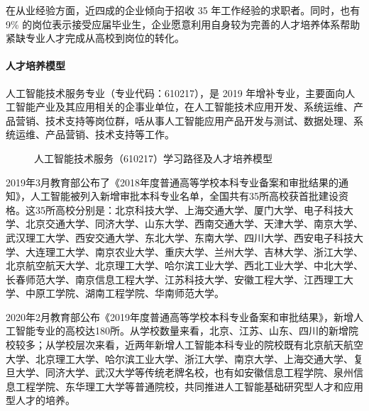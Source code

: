 \documentclass[letterpaper,10pt,english]{sphinxmanual}
\begin{document}
在从业经验方面，近四成的企业倾向于招收 3\sphinxhyphen{}5
年工作经验的求职者。同时，也有 9\%
的岗位表示接受应届毕业生，企业愿意利用自身较为完善的人才培养体系帮助紧缺专业人才完成从高校到岗位的转化。%
\begin{footnote}[750]\sphinxAtStartFootnote
{}
%
\end{footnote}


\paragraph{人才培养模型}
\label{\detokenize{chapter_project/AI_talents:id15}}
人工智能技术服务专业（专业代码：610217），是 2019
年增补专业，主要面向人工智能产业及其应用相关的企事业单位，在人工智能技术应用开发、系统运维、产品营销、技术支持等岗位群，咶从事人工智能应用产品开发与测试、数据处理、系统运维、产品营销、技术支持等工作。

\begin{figure}[H]
\centering
\capstart

\noindent{}
\caption{人工智能技术服务（610217）学习路径及人才培养模型}\label{\detokenize{chapter_project/AI_talents:id23}}\end{figure}

2019年3月教育部公布了《2018年度普通高等学校本科专业备案和审批结果的通知》，人工智能被列入新增审批本科专业名单，全国共有35所高校获首批建设资格。这35所高校分别是：北京科技大学、上海交通大学、厦门大学、电子科技大学、北京交通大学、同济大学、山东大学、西南交通大学、天津大学、南京大学、武汉理工大学、西安交通大学、东北大学、东南大学、四川大学、西安电子科技大学、大连理工大学、南京农业大学、重庆大学、兰州大学、吉林大学、浙江大学、北京航空航天大学、北京理工大学、哈尔滨工业大学、西北工业大学、中北大学、长春师范大学、南京信息工程大学、江苏科技大学、安徽工程大学、江西理工大学、中原工学院、湖南工程学院、华南师范大学。

2020年2月教育部公布《2019年度普通高等学校本科专业备案和审批结果》，新增人工智能专业的高校达180所。从学校数量来看，北京、江苏、山东、四川的新增院校较多；从学校层次来看，近两年新增人工智能本科专业的院校既有北京航天航空大学、北京理工大学、哈尔滨工业大学、浙江大学、南京大学、上海交通大学、复旦大学、同济大学、武汉大学等传统老牌名校，也有如安徽信息工程学院、泉州信息工程学院、东华理工大学等普通院校，共同推进人工智能基础研究型人才和应用型人才的培养。%
\begin{footnote}[751]\sphinxAtStartFootnote
{}
%
\end{footnote}
\end{document}
